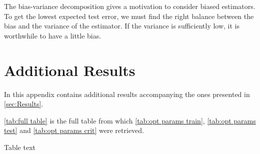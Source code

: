 The bias-variance decomposition gives a motivation to consider biased estimators. To get the lowest expected test error, we must find the right balance between the bias and the variance of the estimator. If the variance is sufficiently low, it is worthwhile to have a little bias.


\section{Additional Results}\label{sec:Appendix B}

In this appendix contains additional results accompanying the ones presented in \autoref{sec:Results}.

\autoref{tab:full table} is the full table from which \autoref{tab:opt params train}, \autoref{tab:opt params test} and \autoref{tab:opt params crit} were retrieved.

\begin{table}[H]
\caption{Table text}
\centering
{}

\label{tab:full table}
\end{table}